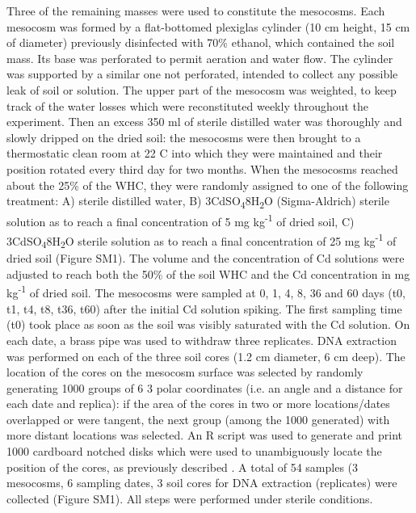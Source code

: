 Three of the remaining masses were used to constitute the mesocosms. Each mesocosm was formed by a flat-bottomed plexiglas cylinder (10 cm height, 15 cm of diameter) previously disinfected with 70\% ethanol, which contained the soil mass. Its base was perforated to permit aeration and water flow. The cylinder was supported by a similar one not perforated, intended to collect any possible leak of soil or solution. The upper part of the mesocosm was weighted, to keep track of the water losses which were reconstituted weekly throughout the experiment. Then an excess 350 ml of sterile distilled water was thoroughly and slowly dripped on the dried soil: the mesocosms were then brought to a thermostatic clean room at 22 {\textdegree}C into which they were maintained and their position rotated every third day for two months. When the mesocosms reached about the 25\% of the WHC, they were randomly assigned to one of the following treatment: A) sterile distilled water, B) 3CdSO\textsubscript{4}{\textperiodcentered}8H\textsubscript{2}O (Sigma-Aldrich) sterile solution as to reach a final concentration of 5 mg kg\textsuperscript{-1} of dried soil, C) 3CdSO\textsubscript{4}{\textperiodcentered}8H\textsubscript{2}O sterile solution as to reach a final concentration of 25 mg kg\textsuperscript{-1} of dried soil (Figure SM1). The volume and the concentration of Cd solutions were adjusted to reach both the 50\% of the soil WHC and the Cd concentration in mg kg\textsuperscript{-1} of dried soil. The mesocosms were sampled at 0, 1, 4, 8, 36 and 60 days (t0, t1, t4, t8, t36, t60) after the initial Cd solution spiking. The first sampling time (t0) took place as soon as the soil was visibly saturated with the Cd solution. On each date, a brass pipe was used to withdraw three replicates. DNA extraction was performed on each of the three soil cores (1.2 cm diameter, 6 cm deep). The location of the cores on the mesocosm surface was selected by randomly generating 1000 groups of 6 {\texttimes} 3 polar coordinates (i.e. an angle and a distance for each date and replica): if the area of the cores in two or more locations/dates overlapped or were tangent, the next group (among the 1000 generated) with more distant locations was selected. An R script was used to generate and print 1000 cardboard notched disks which were used to unambiguously locate the position of the cores, as previously described \cite{ceccherini2007effect}. A total of 54 samples (3 mesocosms, 6 sampling dates, 3 soil cores for DNA extraction (replicates) were collected (Figure SM1). All steps were performed under sterile  conditions.\\

